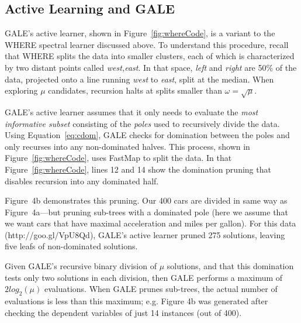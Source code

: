 \documentclass[10pt,journal,compsoc]{IEEEtran}
\newcommand{\eq}[1]{Equation~\ref{eq:#1}}
\newcommand{\fig}[1]{Figure~\ref{fig:#1}}
\begin{document}
\subsection{Active Learning and GALE}\label{sec:al}
GALE's active learner, shown in \fig{whereCode}, is a
variant to the WHERE spectral
learner discussed above.
To understand this procedure, recall 
that WHERE splits the data
into smaller
 clusters, each of which is characterized by two
distant points called {\em west,east}. In that space,
{\em left} and {\em right} are  50\% of the
data, projected onto a line running {\em west} to {\em east},
 split at the median.
When exploring $\mu$ candidates, recursion
halts at splits smaller
than $\omega=\sqrt{\mu}$.


GALE's active learner assumes that it
only needs to evaluate
the 
{\em most informative subset} 
consisting of the {\em poles} used to
recursively divide the data. 
Using \eq{cdom}, GALE checks for domination between
the poles and only recurses into any non-dominated halves.
This process, shown in \fig{whereCode}, uses FastMap
to split the data. 
In that \fig{whereCode}, 
 lines 12 and 14 show the domination
pruning that disables recursion into any dominated half.



Figure~4b demonstrates this pruning.
Our 400 cars are divided in same way as Figure~4a---but
pruning sub-trees with a dominated pole (here
we assume that we want cars that have maximal acceleration and miles per gallon).
For this data (http://goo.gl/VpU8Qd), GALE's active learner
pruned
275 solutions, leaving 
 five leafs of non-dominated solutions.


Given GALE's recursive binary division of $\mu$ solutions, and that this
 domination tests only two
solutions in each division, then GALE
performs  a maximum of $2log_2(\mu)$ evaluations. When GALE prunes sub-trees,
the actual number of evaluations is less than this maximum; e.g. Figure 4b was generated
after checking the dependent variables of just 14 instances (out of 400).
\end{document}
